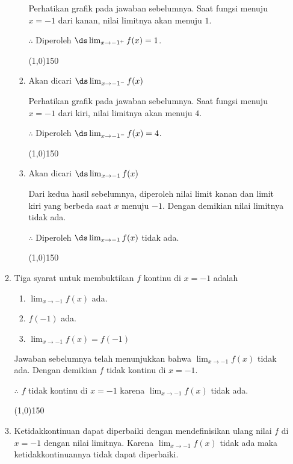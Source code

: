 \begin{enumerate}[leftmargin=*, label={\arabic*}.]
\begin{enumerate}[label={\alph*}.]
\begin{enumerate}[label={\roman*}.]
        Perhatikan grafik pada jawaban sebelumnya. Saat fungsi menuju $x=-1$ dari kanan, nilai 
        limitnya akan menuju $1$.

        $\therefore$ Diperoleh $\ds\lim_{x\to -1^{+}} f(x) = 1$.
\begin{center}
    \line(1,0){150}
\end{center}
        \item Akan dicari $\ds\lim_{x\to -1^{-}} f(x)$
        
        Perhatikan grafik pada jawaban sebelumnya. Saat fungsi menuju $x=-1$ dari kiri, nilai 
        limitnya akan menuju $4$.

        $\therefore$ Diperoleh $\ds\lim_{x\to -1^{-}} f(x) = 4$.
\begin{center}
    \line(1,0){150}
\end{center}
        \item Akan dicari $\ds\lim_{x\to -1} f(x)$
        
        Dari kedua hasil sebelumnya, diperoleh nilai limit kanan dan limit kiri yang berbeda saat 
        $x$ menuju $-1$. Dengan demikian nilai limitnya tidak ada.

        $\therefore$ Diperoleh $\ds\lim_{x\to -1} f(x)$ tidak ada.
\begin{center}
    \line(1,0){150}
\end{center}
    \end{enumerate}
    \item Tiga syarat untuk membuktikan $f$ kontinu di $x=-1$ adalah
    \begin{enumerate}[label={\arabic*}.]
        \item $\lim_{x\to -1} f(x)$ ada.
        \item $f(-1)$ ada.
        \item $\lim_{x\to -1} f(x) = f(-1)$
    \end{enumerate}

    Jawaban sebelumnya telah menunjukkan bahwa $\lim_{x\to -1} f(x)$ tidak ada. Dengan 
    demikian $f$ tidak kontinu di $x=-1$.

    $\therefore$ $f$ tidak kontinu di $x=-1$ karena $\lim_{x\to -1} f(x)$ tidak ada.
\begin{center}
    \line(1,0){150}
\end{center}
    \item Ketidakkontinuan dapat diperbaiki dengan mendefinisikan ulang nilai $f$ di $x=-1$ dengan 
    nilai limitnya. Karena $\lim_{x\to -1} f(x)$ tidak ada maka ketidakkontinuannya tidak dapat 
    diperbaiki.


\end{enumerate}
\end{enumerate}
